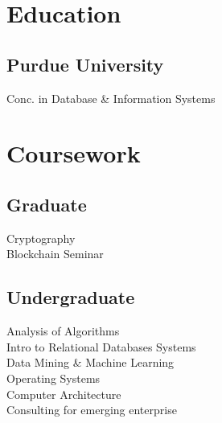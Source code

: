 \documentclass[]{resume_openfont}
\begin{document}
%
%
\lastupdated

%
%



%
%

\begin{minipage}[t]{0.33\textwidth} 


\section{Education} 

\subsection{Purdue University}
Conc. in Database \& Information Systems
\sectionsep


\sectionsep


\section{Coursework}
\subsection{Graduate}
Cryptography \\
Blockchain Seminar \\
\sectionsep



\subsection{Undergraduate}
Analysis of Algorithms \\
Intro to Relational Databases Systems \\
Data Mining \& Machine Learning \\
Operating Systems \\
Computer Architecture \\
Consulting for emerging enterprise \\
\sectionsep


\end{minipage}
\end{document}
